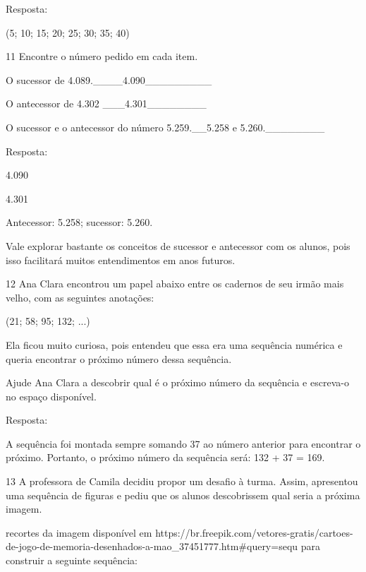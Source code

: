 \begin{escolha}

Resposta:

(5; 10; 15; 20; 25; 30; 35; 40)

\num{11} Encontre o número pedido em cada item.

\begin{escolha}

\item
  O sucessor de 4.089.\_\_\_\_4.090\_\_\_\_\_\_\_\_\_
\item
  O antecessor de 4.302 \_\_\_4.301\_\_\_\_\_\_\_\_
\item
  O sucessor e o antecessor do número 5.259.\_\_5.258 e 5.260.\_\_\_\_\_\_\_\_
\end{escolha}

Resposta:

\begin{escolha}

\item
  4.090
\item
  4.301
\item
  Antecessor: 5.258; sucessor: 5.260.
\end{escolha}

Vale explorar bastante os conceitos de sucessor e antecessor com
os alunos, pois isso facilitará muitos entendimentos em anos futuros.

\num{12} Ana Clara encontrou um papel abaixo entre os cadernos de seu irmão mais velho, com as seguintes anotações:

(21; 58; 95; 132; ...)

Ela ficou muito curiosa, pois entendeu que essa era uma sequência
numérica e queria encontrar o próximo número dessa sequência.

Ajude Ana Clara a descobrir qual é o próximo número da sequência e escreva-o no espaço disponível.


Resposta:

A sequência foi montada sempre somando 37 ao número anterior para
encontrar o próximo. Portanto, o próximo número da sequência será: 132 + 37 = 169.

\num{13} A professora de Camila decidiu propor um desafio à turma. Assim, apresentou uma sequência de figuras e pediu que os alunos descobrissem qual seria a próxima imagem. 

\Usar recortes da imagem disponível em https://br.freepik.com/vetores-gratis/cartoes-de-jogo-de-memoria-desenhados-a-mao_37451777.htm#query=sequ%
para construir a seguinte sequência:


\end{escolha}
